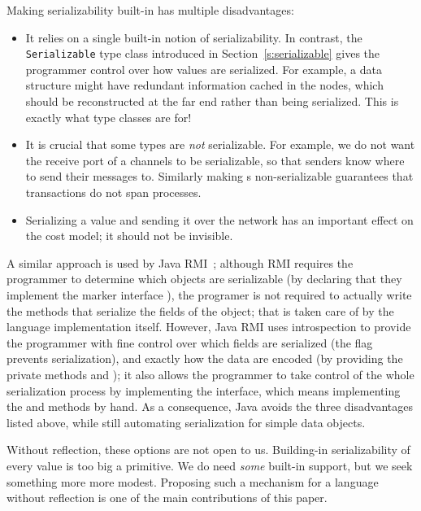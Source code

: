 \documentclass[preprint]{sigplanconf}
\begin{document}
Making serializability built-in
has multiple disadvantages:
\begin{itemize}
\item It relies on a single built-in notion of serializability.
In contrast, the \texttt{Serializable} type class introduced in 
Section~\ref{s:serializable} gives the programmer control over how
values are serialized.  For example, a data structure might have
redundant information cached in the nodes, which should be reconstructed
at the far end rather than being serialized.  
This is exactly what type
classes are for!
\item It is crucial that some types are \emph{not} serializable. For
example, we do not want the receive port of a channels to be serializable, 
so that senders know where to send their messages to.  Similarly making 
s non-serializable guarantees that  transactions 
do not span processes.
\item Serializing a value and sending it over the network has an important
effect on the cost model; it should not be invisible.
\end{itemize}

A similar approach is used by Java RMI~\cite{javarmi}; although RMI requires the programmer to determine which objects are serializable (by declaring that they implement the marker interface ), the programer is not required to actually write the methods that serialize the fields of the object; that is taken care of by the language implementation itself.
However, Java RMI uses introspection to provide the programmer with fine control over
which fields are serialized (the  flag prevents serialization), and exactly how the data are encoded (by providing the private methods  and ); it also allows the programmer to take control of the whole serialization process by implementing the  interface, which means implementing the  and  methods by hand. 
As a consequence, Java avoids the three disadvantages listed above, while still automating serialization for simple data objects.

Without reflection, these options are not open to us.  
Building-in serializability of every value is
too big a primitive.  We do need \emph{some} built-in support, but
we seek something more more modest.  Proposing such a mechanism for a language without reflection is one of 
the main contributions of this paper.
\end{document}
